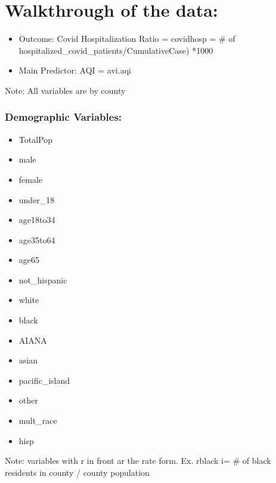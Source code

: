 \documentclass[
]{article}
\providecommand{\tightlist}{%
  \setlength{\itemsep}{0pt}\setlength{\parskip}{0pt}}
\begin{document}
\hypertarget{walkthrough-of-the-data}{%
\section{Walkthrough of the data:}\label{walkthrough-of-the-data}}

\begin{itemize}
\tightlist
\item
  Outcome: Covid Hospitalization Ratio = covidhosp = \# of
  hospitalized\_covid\_patients/CumulativeCase) *1000
\item
  Main Predictor: AQI = avi.aqi
\end{itemize}

Note: All variables are by county

\hypertarget{demographic-variables}{%
\subsubsection{Demographic Variables:}\label{demographic-variables}}

\begin{itemize}
\tightlist
\item
  TotalPop
\item
  male
\item
  female
\item
  under\_18
\item
  age18to34\\
\item
  age35to64\\
\item
  age65\\
\item
  not\_hispanic
\item
  white\\
\item
  black\\
\item
  AIANA\\
\item
  asian\\
\item
  pacific\_island\\
\item
  other\\
\item
  mult\_race\\
\item
  hisp
\end{itemize}

Note: variables with r in front ar the rate form. Ex. rblack i= \# of
black residents in county / county population
\end{document}
